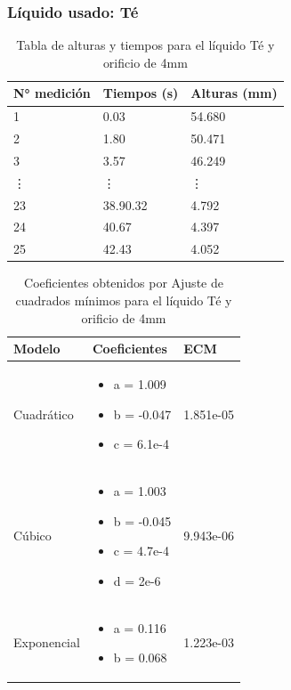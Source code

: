 \documentclass{article}
\begin{document}
\subsubsection{Líquido usado: Té}
\begin{table}[h]
    \begin{center}
        \begin{tabular}{ | m{2cm} | m{2cm} | m{2cm} | }
            \hline N° medición & Tiempos (s) & Alturas (mm) \\ 
            \hline 1 & 0.03 & 54.680 \\
            \hline 2 & 1.80 & 50.471 \\
            \hline 3 & 3.57 & 46.249 \\
            \hline \vdots & \vdots & \vdots \\            
            \hline 23 & 38.90.32 & 4.792 \\
            \hline 24 & 40.67 & 4.397 \\
            \hline 25 & 42.43 & 4.052 \\
            \hline
        \end{tabular}
    \end{center}
    \caption{Tabla de alturas y tiempos para el líquido Té y orificio de 4mm}
\end{table}

\begin{table}[h]
    \begin{center}
        \begin{tabular}{ | m{2cm} | m{5cm} | m{2cm} | }
            \hline Modelo & Coeficientes & ECM \\ 
            \hline Cuadrático & \begin{itemize}
                \item a = 1.009
                \item b = -0.047
                \item c = 6.1e-4
            \end{itemize} & 1.851e-05 \\
            \hline Cúbico & \begin{itemize}
                \item a = 1.003
                \item b = -0.045
                \item c = 4.7e-4
                \item d = 2e-6
            \end{itemize} & 9.943e-06 \\
            \hline Exponencial & \begin{itemize}
                \item a = 0.116
                \item b = 0.068
            \end{itemize} & 1.223e-03 \\
            \hline
        \end{tabular}
    \end{center}
    \caption{Coeficientes obtenidos por Ajuste de cuadrados mínimos para el líquido Té y orificio de 4mm}
\end{table}
\end{document}

